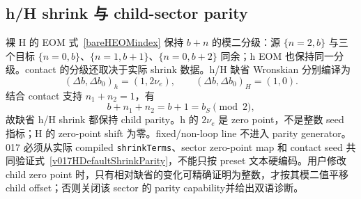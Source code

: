 ﻿\documentclass[a4paper,11pt]{article}
\begin{document}
\subsection{h/H shrink 与 child-sector parity}

裸 H 的 EOM 式~\eqref{bareHEOMindex} 保持 $b+n$ 的模二分级：源 $\{n=2,b\}$ 与三个目标 $\{n=0,b\}$、$\{n=1,b+1\}$、$\{n=0,b+2\}$ 同余；h EOM 也保持同一分级。contact 的分级还取决于实际 shrink 数据。h/H 缺省 Wronskian 分别编译为
\begin{equation}
 (\Delta b,\Delta b_0)_h=(1,2\nu_e),
 \qquad
 (\Delta b,\Delta b_0)_H=(1,0).
 \label{v017HDefaultShrinkParity}
\end{equation}
结合 contact 支持 $n_1+n_2=1$，有
\begin{equation}
 b+n_1+n_2=b+1=b_S\pmod 2,
 \label{v017HContactParity}
\end{equation}
故缺省 h/H shrink 都保持 child parity。h 的 $2\nu_e$ 是 zero point，不是整数 seed 指标；H 的 zero-point shift 为零。fixed/non-loop line 不进入 parity generator。017 必须从实际 compiled \texttt{shrinkTerms}、sector zero-point map 和 contact seed 共同验证式~\eqref{v017HDefaultShrinkParity}，不能只按 preset 文本硬编码。用户修改 child zero point 时，只有相对缺省的变化可精确证明为整数，才按其模二值平移 child offset；否则关闭该 sector 的 parity capability并给出双语诊断。
\end{document}

